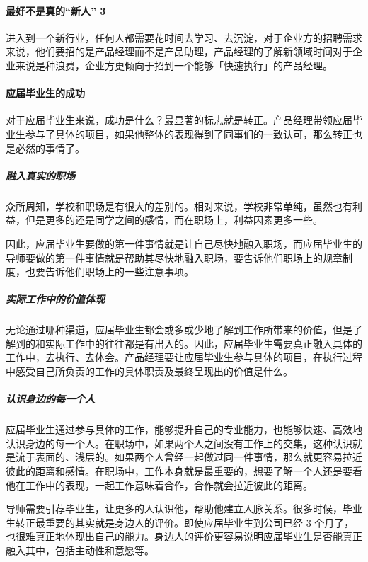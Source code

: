 \documentclass[letterpaper,11pt,english]{sphinxmanual}
\begin{document}
\paragraph{最好不是真的“新人” 3\sphinxfootnotemark[790]}
\label{\detokenize{chapter_interview/new_like:id13}}%
\begin{footnotetext}[790]\sphinxAtStartFootnote
{}
%
\end{footnotetext}\ignorespaces 
进入到一个新行业，任何人都需要花时间去学习、去沉淀，对于企业方的招聘需求来说，他们要招的是产品经理而不是产品助理，产品经理的了解新领域时间对于企业来说是种浪费，企业方更倾向于招到一个能够「快速执行」的产品经理。


\paragraph{应届毕业生的成功}
\label{\detokenize{chapter_interview/new_like:id14}}
对于应届毕业生来说，成功是什么？最显著的标志就是转正。产品经理带领应届毕业生参与了具体的项目，如果他整体的表现得到了同事们的一致认可，那么转正也是必然的事情了。


\subparagraph{融入真实的职场}
\label{\detokenize{chapter_interview/new_like:id15}}
众所周知，学校和职场是有很大的差别的。相对来说，学校非常单纯，虽然也有利益，但是更多的还是同学之间的感情，而在职场上，利益因素更多一些。

因此，应届毕业生要做的第一件事情就是让自己尽快地融入职场，而应届毕业生的导师要做的第一件事情就是帮助其尽快地融入职场，要告诉他们职场上的规章制度，也要告诉他们职场上的一些注意事项。


\subparagraph{实际工作中的价值体现}
\label{\detokenize{chapter_interview/new_like:id16}}
无论通过哪种渠道，应届毕业生都会或多或少地了解到工作所带来的价值，但是了解到的和实际工作中的往往都是有出入的。因此，应届毕业生需要真正融入具体的工作中，去执行、去体会。产品经理要让应届毕业生参与具体的项目，在执行过程中感受自己所负责的工作的具体职责及最终呈现出的价值是什么。


\subparagraph{认识身边的每一个人}
\label{\detokenize{chapter_interview/new_like:id17}}
应届毕业生通过参与具体的工作，能够提升自己的专业能力，也能够快速、高效地认识身边的每一个人。在职场中，如果两个人之间没有工作上的交集，这种认识就是流于表面的、浅层的。如果两个人曾经一起做过同一件事情，那么就更容易拉近彼此的距离和感情。在职场中，工作本身就是最重要的，想要了解一个人还是要看他在工作中的表现，一起工作意味着合作，合作就会拉近彼此的距离。

导师需要引荐毕业生，让更多的人认识他，帮助他建立人脉关系。很多时候，毕业生转正最重要的其实就是身边人的评价。即使应届毕业生到公司已经
3
个月了，也很难真正地体现出自己的能力。身边人的评价更容易说明应届毕业生是否能真正融入其中，包括主动性和意愿等。
\end{document}
